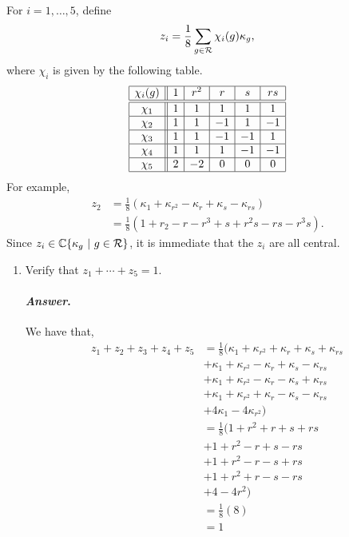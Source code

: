 \documentclass[11pt, reqno]{amsart}
\theoremstyle{plain}
\theoremstyle{definition}
\theoremstyle{example}
\newenvironment{ans}{\medskip \paragraph*{\emph{Answer}.}}{\hfill \break  $~\!\!$ \dotfill \medskip }
\begin{document}
\begin{enumerate}[1.]
For $i = 1, \dots, 5$, define
$$z_i = \frac{1}{8}\sum_{ g \in \mathcal{R}} \chi_i(g) \kappa_g,$$
where $\chi_i$ is given by the following table.
\begin{equation}\label{D8table}
\begin{array}{|c||c|c|c|c|c|}\hline
\chi_i(g) & 1 & r^2 & r & s & rs \\\hline\hline
\chi_1 	& 1 & 1 & 1 & 1 & 1 \\\hline
\chi_2 	& 1 & 1 & -1 & 1 & -1\\\hline
\chi_3	& 1 & 1 & -1 & -1 & 1\\\hline
\chi_4	& 1 & 1 & 1 & -1 & -1\\\hline
\chi_5 	& 2 & -2 & 0 & 0 & 0\\\hline
\end{array}
\end{equation}
For example, 
\begin{align*}
z_2 &= \frac{1}{8}(\kappa_1 + \kappa_{r^2} - \kappa_r + \kappa_s - \kappa_{rs})\\
	&= \frac{1}{8}(1 + r_2 - r - r^3 + s + r^2s - rs - r^3s).
	\end{align*}
Since $z_i \in \mathbb{C}\{\kappa_g ~|~ g \in \mathcal{R}\}$, it is immediate that the $z_i$ are all central.

\begin{enumerate}
\item Verify that $z_1 + \cdots + z_5 = 1$.

\begin{ans}
We have that,
\begin{align*}
z_1 + z_2 + z_3 + z_4 + z_5 &= \frac{1}{8}(\kappa_1 + \kappa_{r^2} + \kappa_r + \kappa_s + \kappa_{rs}\\
&+ \kappa_1 + \kappa_{r^2} - \kappa_r + \kappa_s - \kappa_{rs}\\
&+ \kappa_1 + \kappa_{r^2} - \kappa_r - \kappa_s + \kappa_{rs}\\
&+ \kappa_1 + \kappa_{r^2} + \kappa_r - \kappa_s - \kappa_{rs}\\
&+ 4\kappa_1 - 4\kappa_{r^2})\\
&= \frac{1}{8}(1 + r^2 + r + s + rs\\
&+ 1 + r^2 - r + s - rs\\
&+ 1 + r^2 - r - s + rs\\
&+ 1 + r^2 + r - s - rs\\
&+ 4 - 4r^2)\\
&= \frac{1}{8}(8)\\
&= 1
\end{align*}
\end{ans}


\end{enumerate}
\end{enumerate}
\end{document}
